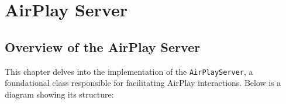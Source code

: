   {\color{teal!90}\chapter{AirPlay Server}\label{cap:AirPlayServer}}


  \minitoc %

  \section{Overview of the AirPlay Server}
  \label{sec:OverviewAirPlayServer}

  This chapter delves into the implementation of the \texttt{AirPlayServer}, a foundational class responsible for facilitating AirPlay interactions. Below is a diagram showing its structure:

